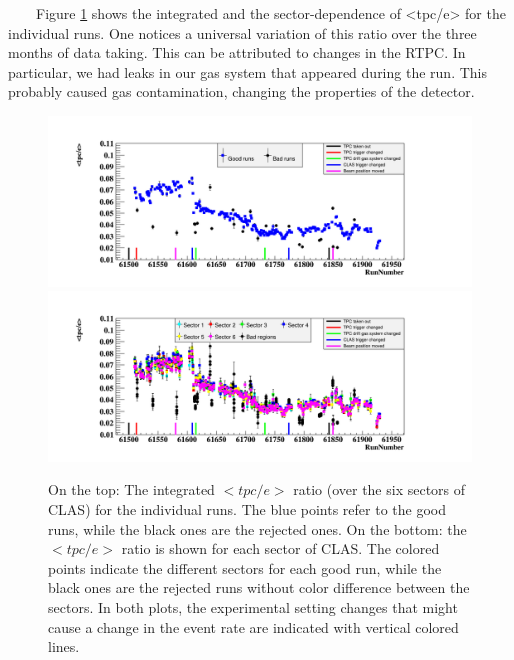 ~~~~Figure \ref{fig:tpc_over_e_Run_sec.png} shows the integrated and the 
sector-dependence of <tpc/e> for the individual runs. One notices a universal 
variation of this ratio over the three months of data taking. This can be 
attributed to changes in the RTPC. In particular, we had leaks in our gas 
system that appeared during the run. This probably caused gas contamination, 
changing the properties of the detector.



\begin{figure}[h!]
\hspace*{-0.3in}\includegraphics[scale=0.45]{fig_dvcs/tpc_over_e_Run.png}
\hspace*{-0.3in}\includegraphics[scale=0.45]{fig_dvcs/tpc_over_e_Run_sec.png}
\caption{On the top: The integrated $<tpc/e>$ ratio (over the six sectors of 
   CLAS) for the individual runs. The blue points refer to the good runs, while 
   the black ones are the rejected ones. On the bottom: the $<tpc/e>$ ratio is 
   shown for each sector of CLAS. The colored points indicate the different 
   sectors for each good run, while the black ones are the rejected runs 
without color difference between the sectors. In both plots, the experimental 
setting changes that might cause a change in the event rate are indicated with 
vertical colored lines.} \label{fig:tpc_over_e_Run_sec.png}
\end{figure}

